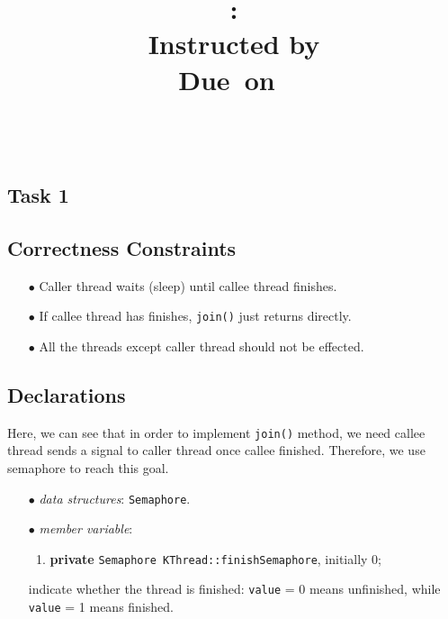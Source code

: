 \documentclass{article}
\title{\textmd{\bf \Class: \Title}\\{\large Instructed by \textit{\ClassInstructor}}\\\normalsize\vspace{0.1in}\small{Due\ on\ \DueDate}}
\date{}
\author{\textbf{\StudentName}\ \ \StudentClass\ \ \StudentNumber}
\begin{document}
  \begin{spacing}{1.1}
    \maketitle \thispagestyle{empty}



    \theoremstyle{plain} \newtheorem{computational}{Definition}
    \section{Task 1}

    \subsection{Correctness Constraints}
    \begin{enumerate}
      \item[$\bullet$] Caller thread waits (sleep) until callee thread finishes.
      \item[$\bullet$] If callee thread has finishes, \texttt{join()} just returns
	directly.
      \item[$\bullet$] All the threads except caller thread should not be effected. 
    \end{enumerate}

    \subsection{Declarations}
    Here, we can see that in order to implement \texttt{join()} method, we need callee
    thread sends a signal to caller thread once callee finished. Therefore, we use
    semaphore to reach this goal. 
    \begin{enumerate}
      \item[$\bullet$] \textit{data structures}: \texttt{Semaphore}.
      \item[$\bullet$] \textit{member variable}:
	\begin{enumerate}
	  \item \textbf{private} \texttt{Semaphore KThread::finishSemaphore}, initially 0;
	\end{enumerate}
	indicate whether the thread is finished: \texttt{value} = 0 means unfinished, while
	\texttt{value} = 1 means finished.


\end{enumerate}
\end{spacing}
\end{document}
